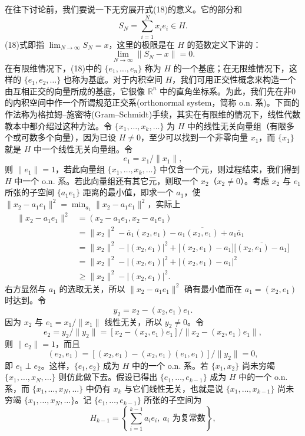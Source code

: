 在往下讨论前，我们要说一下无穷展开式(18)的意义。它的部分和
\[
 S_N=\sum_{i=1}^N x_i e_i\in H.
\]
(18)式即指 $\lim_{N\to\infty}S_N=x$，这里的极限是在 $H$ 的范数定义下讲的：
\begin{equation}
 \lim_{N\to\infty}\|S_N-x\|=0.
 \tag{19}
\end{equation}
在有限维情况下，(18)中的 $\{e_1,\ldots,e_n\}$ 称为 $H$ 的一个基底；在无限维情况下，这样的 $\{e_1,e_2,\ldots\}$ 也称为基底。对于内积空间 $H$，我们可用正交性概念来构造一个由互相正交的向量所成的基底，它很像 $\mathbb R^n$ 中的直角坐标系。为此，我们先在非0的内积空间中作一个所谓规范正交系(orthonormal system，简称 o.n. 系)。下面的作法称为格拉姆--施密特(Gram--Schmidt)手续，其实在有限维的情况下，线性代数教本中都介绍过这种方法。令 $\{x_1,\ldots,x_k,\ldots\}$ 为 $H$ 中的线性无关向量组（有限多个或可数多个向量），因为已设 $H\ne0$，至少可以找到一个非零向量 $x_1$，而 $\{x_1\}$ 就是 $H$ 中一个线性无关向量组。令
\[
 e_1=x_1/\|x_1\|,
\]
则 $\|e_1\|=1$，若此向量组 $\{x_1,\ldots,x_k,\ldots\}$ 中仅含一个元，则过程结束，我们得到 $H$ 中一个 o.n. 系。若此向量组还有其它元，则取一个 $x_2$（$x_2\ne0$）。考虑 $x_2$ 与 $e_1$ 所张的子空间 $\{a_1e_1\}$ 距离的最小值，即求一个 $a_1$，使 $\|x_2-a_1e_1\|^2=\min_{a_1}\|x_2-a_1e_1\|^2$，实际上
\[
 \begin{aligned}
 \|x_2-a_1e_1\|^2
 &= (x_2-a_1e_1,x_2-a_1e_1)\\
 &=\|x_2\|^2-\overline a_1(x_2,e_1)-a_1\overline{(x_2,e_1)}+a_1\overline a_1\\
 &=\|x_2\|^2-| (x_2,e_1)|^2+
   \bigl[(x_2,e_1)-a_1\bigr]\overline{\bigl[(x_2,e_1)-a_1\bigr]}\\
 &=\|x_2\|^2-| (x_2,e_1)|^2+|(x_2,e_1)-a_1|^2\\
 &\ge \|x_2\|^2-| (x_2,e_1)|^2.
 \end{aligned}
\]
右方显然与 $a_1$ 的选取无关，所以 $\|x_2-a_1e_1\|^2$ 确有最小值而在 $a_1=(x_2,e_1)$ 时达到。令
\[
 y_2=x_2-(x_2,e_1)e_1.
\]
因为 $x_2$ 与 $e_1=x_1/\|x_1\|$ 线性无关，所以 $y_2\ne0$。令
\[
 e_2=y_2/\|y_2\|=[x_2-(x_2,e_1)e_1]/\|x_2-(x_2,e_1)e_1\|,
\]
则 $\|e_2\|=1$，而且
\[
 (e_2,e_1)=[(x_2,e_1)-(x_2,e_1)(e_1,e_1)]/\|y_2\|=0,
\]
即 $e_1\perp e_2$。这样，$\{e_1,e_2\}$ 成为 $H$ 中的一个 o.n. 系。若 $\{x_1,x_2\}$ 尚未穷竭 $\{x_1,\ldots,x_N,\ldots\}$ 则仿此做下去。假设已得出 $\{e_1,\ldots,e_{k-1}\}$ 成为 $H$ 中的一个 o.n. 系，而 $\{x_1,\ldots,x_N,\ldots\}$ 中仍有 $x_k$ 与它们线性无关，也就是说 $\{x_1,\ldots,x_{k-1}\}$ 尚未穷竭 $\{x_1,\ldots,x_N,\ldots\}$。记 $\{e_1,\ldots,e_{k-1}\}$ 所张的子空间为
\[
 H_{k-1}=\left\{\sum_{i=1}^{k-1}a_i e_i,\ a_i\text{ 为复常数}\right\},
\]
